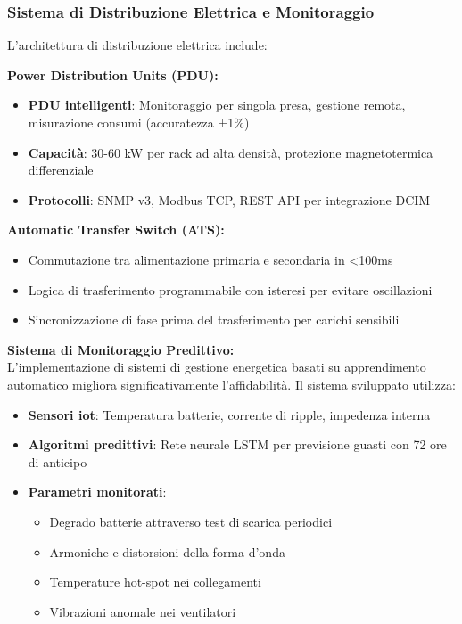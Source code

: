 \subsubsection{\texorpdfstring{\textbf{Sistema di Distribuzione Elettrica e Monitoraggio}}{3.2.1.2 - Sistema di Distribuzione Elettrica e Monitoraggio}}

L'architettura di distribuzione elettrica include:

\textbf{Power Distribution Units (PDU):}
\begin{itemize}
    \item \textbf{PDU intelligenti}: Monitoraggio per singola presa, gestione remota, misurazione consumi (accuratezza ±1\%)
    \item \textbf{Capacità}: 30-60 kW per rack ad alta densità, protezione magnetotermica differenziale
    \item \textbf{Protocolli}: SNMP v3, Modbus TCP, REST API per integrazione DCIM
\end{itemize}

\textbf{Automatic Transfer Switch (ATS):}
\begin{itemize}
    \item Commutazione tra alimentazione primaria e secondaria in <100ms
    \item Logica di trasferimento programmabile con isteresi per evitare oscillazioni
    \item Sincronizzazione di fase prima del trasferimento per carichi sensibili
\end{itemize}

\textbf{Sistema di Monitoraggio Predittivo:}\\
L'implementazione di sistemi di gestione energetica basati su apprendimento automatico migliora significativamente l'affidabilità\autocite{GoogleDeepMind2024}. Il sistema sviluppato utilizza:

\begin{itemize}
    \item \textbf{Sensori \gls{iot}}: Temperatura batterie, corrente di ripple, impedenza interna
    \item \textbf{Algoritmi predittivi}: Rete neurale LSTM per previsione guasti con 72 ore di anticipo
    \item \textbf{Parametri monitorati}: 
    \begin{itemize}
        \item Degrado batterie attraverso test di scarica periodici
        \item Armoniche e distorsioni della forma d'onda
        \item Temperature hot-spot nei collegamenti
        \item Vibrazioni anomale nei ventilatori
    \end{itemize}
\end{itemize}

